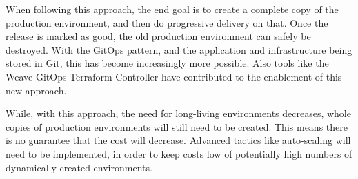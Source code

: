 When following this approach, the end goal is to create a complete copy of the production environment,
and then do progressive delivery on that.
Once the release is marked as good, the old production environment can safely be destroyed.
With the GitOps pattern, and the application and infrastructure being stored in Git,
this has become increasingly more possible.
Also tools like the Weave GitOps Terraform Controller have contributed to the enablement of this new approach. 

While, with this approach, the need for long-living environments decreases,
whole copies of production environments will still need to be created.
This means there is no guarantee that the cost will decrease.
Advanced tactics like auto-scaling will need to be implemented, in order to
keep costs low of potentially high numbers of dynamically created environments.





































